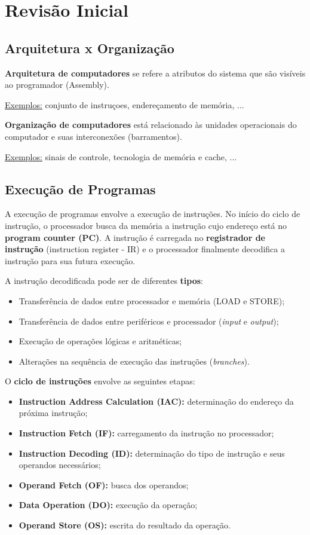 \chapter{Revisão Inicial}

\section{Arquitetura x Organização}
\textbf{Arquitetura de computadores} se refere a atributos do sistema que são visíveis ao programador (Assembly).

\underline{Exemplos:} conjunto de instruçoes, endereçamento de memória, ...

\textbf{Organização de computadores} está relacionado às unidades operacionais do computador e suas interconexões (barramentos).

\underline{Exemplos:} sinais de controle, tecnologia de memória e cache, ...



\section{Execução de Programas}
A execução de programas envolve a execução de instruções. No início do ciclo de instrução, o processador busca da memória a instrução cujo endereço está no \textbf{program counter (PC)}. A instrução é carregada no \textbf{registrador de instrução} (instruction register - IR) e  o processador finalmente decodifica a instrução para sua futura execução.

A instrução decodificada pode ser de diferentes \textbf{tipos}:

\begin{itemize}
  \item Transferência de dados entre processador e memória (LOAD e STORE);
  \item Transferência de dados entre periféricos e processador (\textit{input} e \textit{output});
  \item Execução de operações lógicas e aritméticas;
  \item Alterações na sequência de execução das instruções (\textit{branches}).
\end{itemize}

O \textbf{ciclo de instruções} envolve as seguintes etapas:

\begin{itemize}
  \item \textbf{Instruction Address Calculation (IAC):} determinação do endereço da próxima instrução;
  \item \textbf{Instruction Fetch (IF):} carregamento da instrução no processador;
  \item \textbf{Instruction Decoding (ID):} determinação do tipo de instrução e seus operandos necessários;
  \item \textbf{Operand Fetch (OF):} busca dos operandos;
  \item \textbf{Data Operation (DO):} execução da operação;
  \item \textbf{Operand Store (OS):} escrita do resultado da operação.
\end{itemize}


